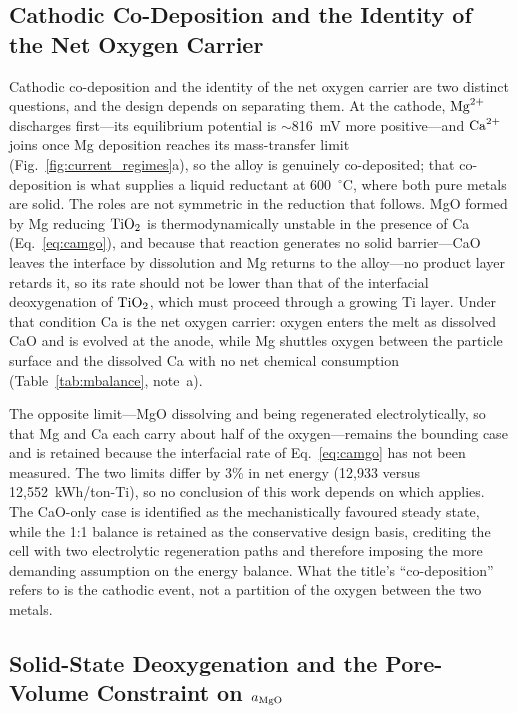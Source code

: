 \documentclass[11pt]{article}
\begin{document}
\subsection*{Cathodic Co-Deposition and the Identity of the Net Oxygen Carrier}

Cathodic co-deposition and the identity of the net oxygen carrier are two distinct questions, and the design depends on separating them. At the cathode, $\ce{Mg^{2+}}$ discharges first---its equilibrium potential is $\sim$816~mV more positive---and $\ce{Ca^{2+}}$ joins once Mg deposition reaches its mass-transfer limit (Fig.~\ref{fig:current_regimes}a), so the alloy is genuinely co-deposited; that co-deposition is what supplies a liquid reductant at 600~$^{\circ}$C, where both pure metals are solid. The roles are not symmetric in the reduction that follows. MgO formed by Mg reducing $\ce{TiO2}$ is thermodynamically unstable in the presence of Ca (Eq.~\ref{eq:camgo}), and because that reaction generates no solid barrier---CaO leaves the interface by dissolution and Mg returns to the alloy---no product layer retards it, so its rate should not be lower than that of the interfacial deoxygenation of $\ce{TiO2}$, which must proceed through a growing Ti layer. Under that condition Ca is the net oxygen carrier: oxygen enters the melt as dissolved CaO and is evolved at the anode, while Mg shuttles oxygen between the particle surface and the dissolved Ca with no net chemical consumption (Table~\ref{tab:mbalance}, note~a).

The opposite limit---MgO dissolving and being regenerated electrolytically, so that Mg and Ca each carry about half of the oxygen---remains the bounding case and is retained because the interfacial rate of Eq.~\ref{eq:camgo} has not been measured. The two limits differ by 3\% in net energy (12{,}933 versus 12{,}552~kWh/ton-Ti), so no conclusion of this work depends on which applies. The CaO-only case is identified as the mechanistically favoured steady state, while the 1:1 balance is retained as the conservative design basis, crediting the cell with two electrolytic regeneration paths and therefore imposing the more demanding assumption on the energy balance. What the title's ``co-deposition'' refers to is the cathodic event, not a partition of the oxygen between the two metals.

\subsection*{Solid-State Deoxygenation and the Pore-Volume Constraint on \texorpdfstring{$a_{\ce{MgO}}$}{aMgO}}
\end{document}
